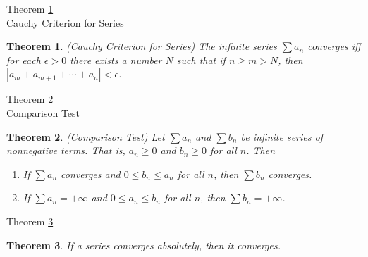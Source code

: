 \documentclass[avery5371,grid]{flashcards}
\newtheorem{theorem}{Theorem}
\begin{document}
\begin{flashcard}[Theorem]{Theorem \ref{thm106}\\
Cauchy Criterion for Series}
\begin{theorem}
\label{thm106}
(Cauchy Criterion for Series)  The infinite series
$\displaystyle \sum a_n$ converges iff for each $\epsilon > 0$ there
exists a number $N$ such that if $n \geq m > N$, then $|a_m + a_{m+1} +
\cdots + a_n|< \epsilon$.
\end{theorem}
\end{flashcard}

\begin{flashcard}[Theorem]{Theorem \ref{thm107}\\ Comparison Test}
\begin{theorem}
\label{thm107}
(Comparison Test)  Let $\displaystyle \sum a_n$ and
$\displaystyle \sum b_n$ be infinite series of nonnegative terms.  That
is, $a_n \geq 0$ and $b_n \geq 0$ for all $n$.  Then
\begin{enumerate}
\item If $\displaystyle \sum a_n$ converges and $0 \leq b_n \leq a_n$
for all $n$, then $\displaystyle \sum b_n$ converges.
\item  If $\displaystyle \sum a_n = + \infty$ and $0 \leq a_n \leq b_n$
for all $n$, then $\displaystyle \sum b_n = + \infty$.
\end{enumerate}
\end{theorem}
\end{flashcard}

\begin{flashcard}[Theorem]{Theorem \ref{thm108}}
\begin{theorem}
\label{thm108}
If a series converges absolutely, then it converges.
\end{theorem}
\end{flashcard}
\end{document}
